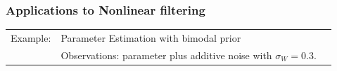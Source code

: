 \documentclass[xcolor=dvipsnames, subsection=false]{beamer}
\def\alertb#1{\alert{\color{BrickRed}  #1}}
\def\alertb#1{\alert{\color{BrickRed}  #1}}
\begin{document}
\begin{frame}
\frametitle{Applications to Nonlinear filtering}

\begin{minipage}[t][6.5cm][t]{\textwidth}
	
	\begin{tabular}{lll}\alertb{Example:}   & Parameter Estimation with bimodal prior
		\\
		&   Observations:  parameter plus additive noise with $\sigma_W = 0.3$.
	\end{tabular}
	
	
	\centering

\end{minipage}
\end{frame}
\end{document}
